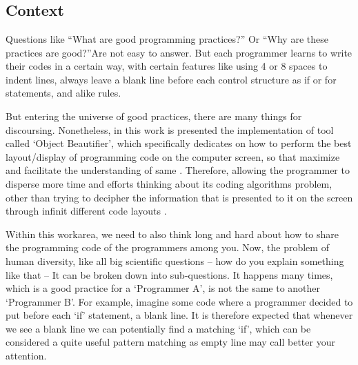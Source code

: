 

%


\chapter{}


    \section{Context}

    Questions like ``What are good programming practices?'' Or ``Why are these
    practices are good?''Are not easy to answer. But each programmer learns to
    write their codes in a certain way, with certain features like using 4 or 8
    spaces to indent lines, always leave a blank line before each control
    structure as if or for statements, and alike rules.
    \cite{naturalCodingConventions}

    But entering the universe of good practices, there are many things for
    discoursing. Nonetheless, in this work is presented the implementation of
    tool called `Object Beautifier', which specifically dedicates on how to
    perform the best layout/display of programming code on the computer screen,
    so that maximize and facilitate the understanding of same
    \cite{automaticSynthesis}.
    Therefore, allowing the programmer to disperse
    more time and efforts thinking about its coding algorithms problem,
    other than trying to decipher the information that is presented
    to it on the screen through infinit different code layouts
    \cite{usingVersionControlData}.

    Within this work\s area, we need to also think long and hard about how to
    share the programming code of the programmers among you. Now, the problem of
    human diversity, like all big scientific questions -- how do you explain
    something like that -- It can be broken down into sub-questions. It happens
    many times, which is a good practice for a `Programmer A', is not the same
    to another `Programmer B'. For example, imagine some code where a programmer
    decided to put before each `if' statement, a blank line. It is therefore
    expected that whenever we see a blank line we can potentially find a
    matching `if', which can be considered a quite useful pattern matching as
    empty line may call better your attention. \cite{aPrettyGoodFormatting}


